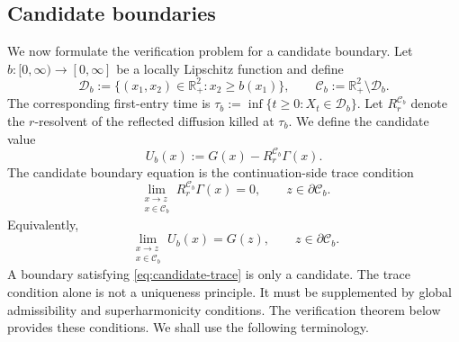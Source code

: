 \documentclass[pdflatex,sn-mathphys-num]{sn-jnl}
\theoremstyle{plain}
\theoremstyle{definition}
\theoremstyle{remark}
\numberwithin{equation}{section}
\begin{document}
\subsection{Candidate boundaries} \label{subsec:candidate-boundaries} 

We now formulate the verification problem for a candidate boundary. Let \(b:[0,\infty)\to[0,\infty]\) be a locally Lipschitz function and define 
\[
\mathcal D_b:=\{(x_1,x_2)\in\mathbb R_+^2:x_2\ge b(x_1)\}, \qquad \mathcal C_b:=\mathbb R_+^2\setminus\mathcal D_b . 
\]
The corresponding first-entry time is 
$\displaystyle \tau_b:=\inf\{t\ge0:X_t\in\mathcal D_b\}$. 
Let \(R_r^{\mathcal C_b}\) denote the \(r\)-resolvent of the reflected diffusion killed at \(\tau_b\). We define the candidate value 
\begin{equation} \label{eq:Ub-definition} 
U_b(x):=G(x)-R_r^{\mathcal C_b}\Gamma(x). 
\end{equation} 
The candidate boundary equation is the continuation-side trace condition 
\begin{equation} \label{eq:candidate-trace} 
\lim_{\substack{x\to z\\ x\in\mathcal C_b}} R_r^{\mathcal C_b}\Gamma(x)=0, \qquad z\in\partial\mathcal C_b . 
\end{equation} 
Equivalently, 
\[
\lim_{\substack{x\to z\\ x\in\mathcal C_b}} U_b(x)=G(z), \qquad z\in\partial\mathcal C_b . 
\]
A boundary satisfying \eqref{eq:candidate-trace} is only a candidate. The trace condition alone is not a uniqueness principle. It must be supplemented by global admissibility and superharmonicity conditions. The verification theorem below provides these conditions. We shall use the following terminology. 
\end{document}
